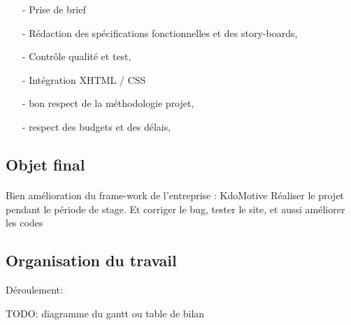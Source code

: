\begin{itemize}
  \item [-]Prise de brief 
  \item [-]Rédaction des spécifications fonctionnelles et des story-boards, 
  \item [-]Contrôle qualité et test, 
  \item [-]Intégration XHTML / CSS
  \item [-]bon respect de la méthodologie projet,
  \item [-]respect des budgets et des délais, 
\end{itemize}

\subsection{Objet final}
\paragraph{}
Bien amélioration du frame-work de l'entreprise : KdoMotive
Réaliser le projet pendant le période de stage. Et corriger le bug, tester le site, et aussi améliorer les codes

\subsection{Organisation du travail}
Déroulement:

TODO: diagramme du gantt
ou table de bilan
%

